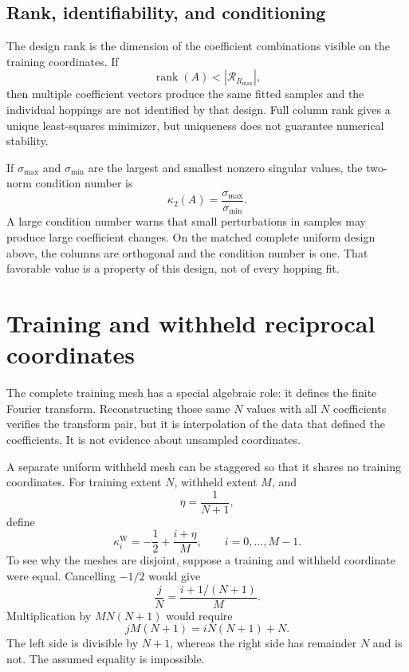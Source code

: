 \subsection{Rank, identifiability, and conditioning}

The design rank is the dimension of the coefficient combinations visible on
the training coordinates. If
\begin{equation}
  \operatorname{rank}(A)<|\mathcal R_{R_{\max}}|,
\end{equation}
then multiple coefficient vectors produce the same fitted samples and the
individual hoppings are not identified by that design. Full column rank gives a
unique least-squares minimizer, but uniqueness does not guarantee numerical
stability.

If $\sigma_{\max}$ and $\sigma_{\min}$ are the largest and smallest nonzero
singular values, the two-norm condition number is
\begin{equation}
  \kappa_2(A)=\frac{\sigma_{\max}}{\sigma_{\min}}.
  \label{eq:training-isolated-design-condition}
\end{equation}
A large condition number warns that small perturbations in samples may produce
large coefficient changes. On the matched complete uniform design above, the
columns are orthogonal and the condition number is one. That favorable value is
a property of this design, not of every hopping fit.

\section{Training and withheld reciprocal coordinates}

The complete training mesh has a special algebraic role: it defines the
finite Fourier transform. Reconstructing those same $N$ values with all $N$
coefficients verifies the transform pair, but it is interpolation of the data
that defined the coefficients. It is not evidence about unsampled coordinates.

A separate uniform withheld mesh can be staggered so that it shares no training
coordinates. For training extent $N$, withheld extent $M$, and
\begin{equation}
  \eta=\frac{1}{N+1},
\end{equation}
define
\begin{equation}
  \kappa_i^{\mathrm W}
  =-\frac12+\frac{i+\eta}{M},
  \qquad i=0,\ldots,M-1.
  \label{eq:training-isolated-withheld-mesh}
\end{equation}
To see why the meshes are disjoint, suppose a training and withheld coordinate
were equal. Cancelling $-1/2$ would give
\begin{equation}
  \frac{j}{N}=\frac{i+1/(N+1)}{M}.
\end{equation}
Multiplication by $MN(N+1)$ would require
\begin{equation}
  jM(N+1)=iN(N+1)+N.
\end{equation}
The left side is divisible by $N+1$, whereas the right side has remainder $N$
and is not. The assumed equality is impossible.

